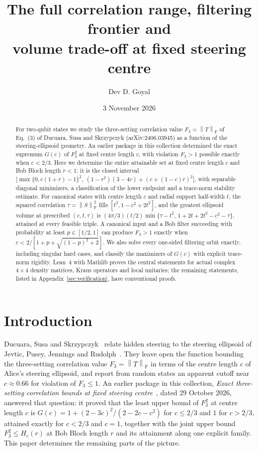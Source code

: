 \documentclass[11pt,a4paper]{article}
\title{The full correlation range, filtering frontier and\\volume trade-off at fixed steering centre}
\author{Dev D. Goyal}
\date{3 November 2026}
\theoremstyle{remark}\newtheorem{remark}[theorem]{Remark}
\newcommand{\norm}[1]{\left\lVert#1\right\rVert}
\begin{document}
\maketitle
\begin{abstract}
For two-qubit states we study the three-setting correlation value
$F_3=\norm T_{\mathrm F}$ of Eq.~(3) of Ducuara, Susa and Skrzypczyk
(arXiv:2406.03945) as a function of the steering-ellipsoid geometry.
An earlier package in this collection determined the exact supremum
$G(c)$ of $F_3^2$ at fixed centre length $c$, with violation $F_3>1$
possible exactly when $c<2/3$. Here we determine the entire attainable
set at fixed centre length $c$ and Bob Bloch length $r<1$: it is the closed
interval
$\bigl[\max\{0,c(1+r)-1\}^2,\ (1-r^2)(3-4c)+(c+(1-c)r)^2\bigr]$, with
separable diagonal minimizers, a classification of the lower endpoint and
a trace-norm stability estimate. For canonical states with centre
length $c$ and radial support half-width $t$, the squared correlation
$\tau=\norm S_{\mathrm F}^2$ fills $[t^2,1-c^2+2t^2]$, and the greatest
ellipsoid volume at prescribed $(c,t,\tau)$ is
$(4\pi/3)(t/2)\min\{\tau-t^2,\,1+2t+2t^2-c^2-\tau\}$, attained at every
feasible triple. A canonical input and a Bob filter succeeding with
probability at least $p\in[1/2,1]$ can produce $F_3>1$ exactly when
$c<2/[1+p+\sqrt{(1-p)^2+2}]$. We also solve every one-sided filtering
orbit exactly, including singular hard cases, and classify the maximizers
of $G(c)$ with explicit trace-norm rigidity. Lean~4 with Mathlib proves the
central statements for actual complex $4\times4$ density matrices, Kraus
operators and local unitaries; the remaining statements, listed in
Appendix~\ref{sec:verification}, have conventional proofs.
\end{abstract}

\section{Introduction}
Ducuara, Susa and Skrzypczyk~\cite{ducuara} relate hidden steering to the
steering ellipsoid of Jevtic, Pusey, Jennings and Rudolph~\cite{jevtic}.
They leave open the function bounding the three-setting correlation
value $F_3=\norm T_{\mathrm F}$ in terms of the centre length $c$ of Alice's
steering ellipsoid, and report from random states an apparent cutoff near
$c\approx0.66$ for violation of $F_3\leq1$. An earlier package in this
collection, \emph{Exact three-setting correlation bounds at fixed steering
centre}~\cite{earlier}, dated 29 October 2026, answered that question: it
proved that the least upper bound of $F_3^2$ at centre length $c$ is
$G(c)=1+(2-3c)^2/(2-2c-c^2)$ for $c\leq2/3$ and $1$ for $c>2/3$, attained
exactly for $c<2/3$ and $c=1$, together with the joint upper bound
$F_3^2\leq H_c(r)$ at Bob Bloch length $r$ and its attainment along one
explicit family. This paper determines the remaining parts of the picture.
\end{document}

